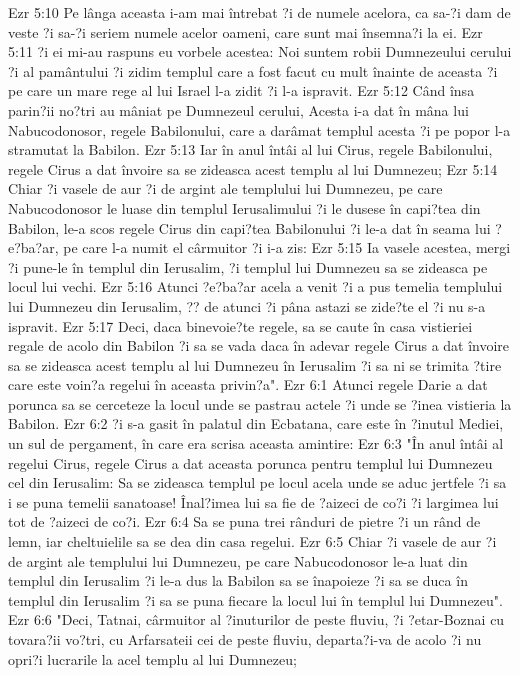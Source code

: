 Ezr 5:10  Pe lânga aceasta i-am mai întrebat ?i de numele acelora, ca sa-?i dam de veste ?i sa-?i seriem numele acelor oameni, care sunt mai însemna?i la ei.
Ezr 5:11  ?i ei mi-au raspuns eu vorbele acestea: Noi suntem robii Dumnezeului cerului ?i al pamântului ?i zidim templul care a fost facut cu mult înainte de aceasta ?i pe care un mare rege al lui Israel l-a zidit ?i l-a ispravit.
Ezr 5:12  Când însa parin?ii no?tri au mâniat pe Dumnezeul cerului, Acesta i-a dat în mâna lui Nabucodonosor, regele Babilonului, care a darâmat templul acesta ?i pe popor l-a stramutat la Babilon.
Ezr 5:13  Iar în anul întâi al lui Cirus, regele Babilonului, regele Cirus a dat învoire sa se zideasca acest templu al lui Dumnezeu;
Ezr 5:14  Chiar ?i vasele de aur ?i de argint ale templului lui Dumnezeu, pe care Nabucodonosor le luase din templul Ierusalimului ?i le dusese în capi?tea din Babilon, le-a scos regele Cirus din capi?tea Babilonului ?i le-a dat în seama lui ?e?ba?ar, pe care l-a numit el cârmuitor ?i i-a zis:
Ezr 5:15  Ia vasele acestea, mergi ?i pune-le în templul din Ierusalim, ?i templul lui Dumnezeu sa se zideasca pe locul lui vechi.
Ezr 5:16  Atunci ?e?ba?ar acela a venit ?i a pus temelia templului lui Dumnezeu din Ierusalim, ?? de atunci ?i pâna astazi se zide?te el ?i nu s-a ispravit.
Ezr 5:17  Deci, daca binevoie?te regele, sa se caute în casa vistieriei regale de acolo din Babilon ?i sa se vada daca în adevar regele Cirus a dat învoire sa se zideasca acest templu al lui Dumnezeu în Ierusalim ?i sa ni se trimita ?tire care este voin?a regelui în aceasta privin?a".
Ezr 6:1  Atunci regele Darie a dat porunca sa se cerceteze la locul unde se pastrau actele ?i unde se ?inea vistieria la Babilon.
Ezr 6:2  ?i s-a gasit în palatul din Ecbatana, care este în ?inutul Mediei, un sul de pergament, în care era scrisa aceasta amintire:
Ezr 6:3  "În anul întâi al regelui Cirus, regele Cirus a dat aceasta porunca pentru templul lui Dumnezeu cel din Ierusalim: Sa se zideasca templul pe locul acela unde se aduc jertfele ?i sa i se puna temelii sanatoase! Înal?imea lui sa fie de ?aizeci de co?i ?i largimea lui tot de ?aizeci de co?i.
Ezr 6:4  Sa se puna trei rânduri de pietre ?i un rând de lemn, iar cheltuielile sa se dea din casa regelui.
Ezr 6:5  Chiar ?i vasele de aur ?i de argint ale templului lui Dumnezeu, pe care Nabucodonosor le-a luat din templul din Ierusalim ?i le-a dus la Babilon sa se înapoieze ?i sa se duca în templul din Ierusalim ?i sa se puna fiecare la locul lui în templul lui Dumnezeu".
Ezr 6:6  "Deci, Tatnai, cârmuitor al ?inuturilor de peste fluviu, ?i ?etar-Boznai cu tovara?ii vo?tri, cu Arfarsateii cei de peste fluviu, departa?i-va de acolo ?i nu opri?i lucrarile la acel templu al lui Dumnezeu;
